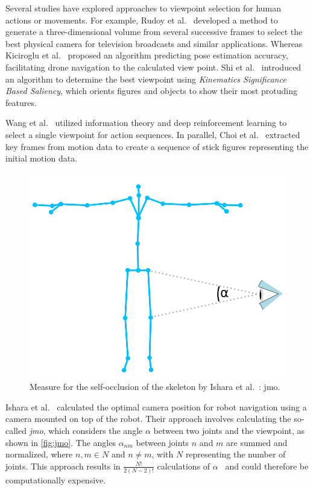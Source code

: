 Several studies have explored approaches to viewpoint selection for human actions or movements. For example, Rudoy et al.~\cite{rudoy2011vsh} developed a method to generate a three-dimensional volume from several successive frames to select the best physical camera for television broadcasts and similar applications. Whereas Kiciroglu et al.~\cite{kiciroglu2020amc} proposed an algorithm predicting pose estimation accuracy, facilitating drone navigation to the calculated view point. Shi et al.~\cite{shi2012ksb} introduced an algorithm to determine the best viewpoint using \emph{Kinematics Significance Based Saliency}, which orients figures and objects to show their most protuding features.

Wang et al.~\cite{wang2019asw} utilized information theory and deep reinforcement learning to select a single viewpoint for action sequences. In parallel, Choi et al.~\cite{choi2012rav} extracted key frames from motion data to create a sequence of stick figures representing the initial motion data.

\begin{figure}[ht]
	\centering
	\includegraphics[width=0.6\linewidth]{pictures/skeleton_E_occ.png}
	\caption[Measure for the self-occlusion of the skeleton by Ishara et al.~\cite{ishara2015mra}.]{Measure for the self-occlusion of the skeleton by Ishara et al.~\cite{ishara2015mra}: \acrlong{jmo}.}
	\label{fig:jmo}
\end{figure}

Ishara et al.~\cite{ishara2015mra} calculated the optimal camera position for robot navigation using a camera mounted on top of the robot. Their approach involves calculating the so-called \emph{\acrfull{jmo}}, which considers the angle \(\alpha\) between two joints and the viewpoint, as shown in \autoref{fig:jmo}. The angles \(\alpha_{nm}\) between joints \(n\) and \(m\) are summed and normalized, where \(n,m \in N\) and \(n \neq m\), with \(N\) representing the number of joints. This approach results in \(\frac{N!}{2(N-2)!}\) calculations of \(\alpha\)~\cite{charalambides2002enumerative} and could therefore be computationally expensive. 

